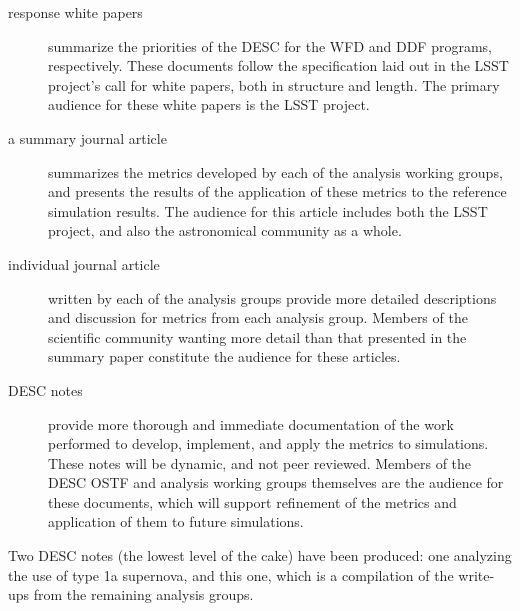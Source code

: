 \begin{description}
  \item[response white papers] summarize the priorities of the DESC
    for the WFD and DDF programs, respectively. These documents follow
    the specification laid out in the LSST project's call for white
    papers, both in structure and length. The primary audience for
    these white papers is the LSST project.
  \item[a summary journal article] summarizes the metrics developed by
    each of the analysis working groups, and presents the results of
    the application of these metrics to the reference simulation
    results. The audience for this article includes both the LSST
    project, and also the astronomical community as a whole.
  \item[individual journal article] written by each of the analysis
    groups provide more detailed descriptions and discussion for
    metrics from each analysis group. Members of the scientific
    community wanting more detail than that presented in the summary
    paper constitute the audience for these articles.
  \item[DESC notes] provide more thorough and immediate documentation
    of the work performed to develop, implement, and apply the metrics
    to simulations. These notes will be dynamic, and not peer
    reviewed. Members of the DESC OSTF and analysis working groups
    themselves are the audience for these documents, which will
    support refinement of the metrics and application of them to
    future simulations.
\end{description}


Two DESC notes (the lowest level of the cake) have been produced:
one analyzing the use of type 1a supernova, and this one, which is a
compilation of the write-ups from the remaining analysis groups.
